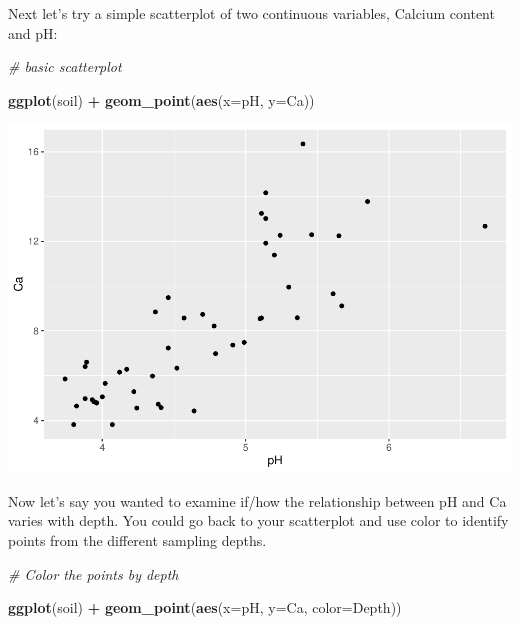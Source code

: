 \documentclass[
]{article}
\newenvironment{Shaded}{\begin{snugshade}}{\end{snugshade}}
\newcommand{\AttributeTok}[1]{\textcolor[rgb]{0.13,0.29,0.53}{#1}}
\newcommand{\CommentTok}[1]{\textcolor[rgb]{0.56,0.35,0.01}{\textit{#1}}}
\newcommand{\FunctionTok}[1]{\textcolor[rgb]{0.13,0.29,0.53}{\textbf{#1}}}
\newcommand{\NormalTok}[1]{#1}
\newcommand{\SpecialCharTok}[1]{\textcolor[rgb]{0.81,0.36,0.00}{\textbf{#1}}}
\begin{document}
Next let's try a simple scatterplot of two continuous variables, Calcium
content and pH:

\begin{Shaded}
\begin{Highlighting}[]
\CommentTok{\# basic scatterplot}

\FunctionTok{ggplot}\NormalTok{(soil) }\SpecialCharTok{+}
  \FunctionTok{geom\_point}\NormalTok{(}\FunctionTok{aes}\NormalTok{(}\AttributeTok{x=}\NormalTok{pH, }\AttributeTok{y=}\NormalTok{Ca))}
\end{Highlighting}
\end{Shaded}

\includegraphics{module1_3_files/figure-latex/unnamed-chunk-25-1.pdf}

Now let's say you wanted to examine if/how the relationship between pH
and Ca varies with depth. You could go back to your scatterplot and use
color to identify points from the different sampling depths.

\begin{Shaded}
\begin{Highlighting}[]
\CommentTok{\# Color the points by depth}

\FunctionTok{ggplot}\NormalTok{(soil) }\SpecialCharTok{+}
  \FunctionTok{geom\_point}\NormalTok{(}\FunctionTok{aes}\NormalTok{(}\AttributeTok{x=}\NormalTok{pH, }\AttributeTok{y=}\NormalTok{Ca, }\AttributeTok{color=}\NormalTok{Depth))}
\end{Highlighting}
\end{Shaded}
\end{document}
